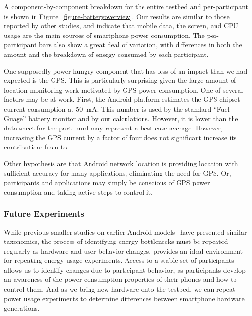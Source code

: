 A component-by-component breakdown for the entire testbed and per-participant
is shown in Figure~\ref{figure-batteryoverview}. Our results are similar to
those reported by other studies, and indicate that mobile data, the screen,
and CPU usage are the main sources of smartphone power consumption. The
per-participant bars also show a great deal of variation, with differences in
both the amount and the breakdown of energy consumed by each participant.

One supposedly power-hungry component that has less of an impact than we had
expected is the GPS. This is particularly surprising given the large amount
of location-monitoring work motivated by GPS power consumption. One of
several factors may be at work. First, the Android platform estimates the GPS
chipset current consumption at 50~mA. This number is used by the standard
``Fuel Guage'' battery monitor and by our calculations. However, it is lower
than the data sheet for the part~\cite{FIXME} and may represent a best-case
average. However, increasing the GPS current by a factor of four does not
significant increase its contribution: from  to .

Other hypothesis are that Android network location is providing location with
sufficient accuracy for many applications, eliminating the need for GPS. Or,
participants and applications may simply be conscious of GPS power
consumption and taking active steps to control it.

\subsubsection{Future Experiments}

While previous smaller studies on earlier Android
models~\cite{shye:micro:2009} have presented similar taxonomies, the process
of identifying energy bottlenecks must be repeated regularly as hardware and
user behavior changes. \PhoneLab{} provides an ideal environment for
repeating energy usage experiments. Access to a stable set of participants
allows us to identify changes due to participant behavior, as participants
develop an awareness of the power consumption properties of their phones and
how to control them. And as we bring new hardware onto the testbed, we can
repeat power usage experiments to determine differences between smartphone
hardware generations.
